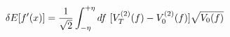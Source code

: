 \begin{equation}
\delta E [ f'(x) ] = 
 {1\over {\sqrt{2}}} \int_{-\eta}^{+\eta} df ~
                   [ V_T^{(2)} (f) - V_0^{(2)} (f) ] \sqrt{V_0 (f)}
\label{deltaEfprimewrtf}
\end{equation}


